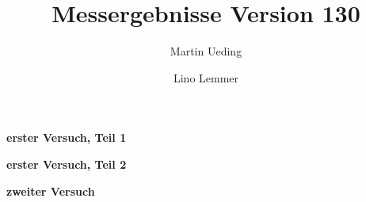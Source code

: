 \documentclass[10pt,twocolumn]{article}
\title{Messergebnisse Version 130}
\author{Martin Ueding \and Lino Lemmer}
\begin{document}
\maketitle

\textbf{erster Versuch, Teil 1}



\textbf{erster Versuch, Teil 2}



\textbf{zweiter Versuch}


\end{document}

